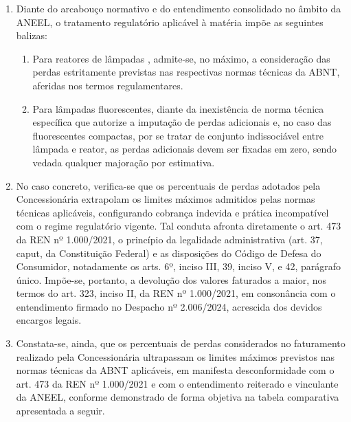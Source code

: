\begin{enumerate}[resume]
{(iii) determinar que esta decisão seja cumprida no prazo de 15 (quinze) dias após o seu trânsito em julgado; e  

(iv) determinar que a distribuidora envie à ANEEL, num prazo máximo de 15 (quinze) dias após o prazo previsto no item

(viii) desta decisão, comprovação do seu cumprimento. (grifou-se)}

\item
Diante do arcabouço normativo e do entendimento consolidado no âmbito da ANEEL, o tratamento regulatório aplicável à matéria impõe as seguintes balizas: 

\begin{enumerate}
    \ifperdaVapor
    \item %
    Para reatores de lâmpadas , admite-se, no máximo, a consideração das perdas estritamente previstas nas respectivas normas técnicas da ABNT, aferidas nos termos regulamentares.
    \fi
    \ifperdaFluorescente
    \item %
    Para lâmpadas fluorescentes, diante da inexistência de norma técnica específica que autorize a imputação de perdas adicionais  e, no caso das fluorescentes compactas, por se tratar de conjunto indissociável entre lâmpada e reator, as perdas adicionais devem ser fixadas em zero, sendo vedada qualquer majoração por estimativa.
    \fi
\end{enumerate}

\ifperdaVapor
\item %
No caso concreto, verifica-se que os percentuais de perdas adotados pela Concessionária extrapolam os limites máximos admitidos pelas normas técnicas aplicáveis, configurando cobrança indevida e prática incompatível com o regime regulatório vigente. Tal conduta afronta diretamente o art. 473 da REN nº 1.000/2021, o princípio da legalidade administrativa (art. 37, caput, da Constituição Federal) e as disposições do Código de Defesa do Consumidor, notadamente os arts. 6º, inciso III, 39, inciso V, e 42, parágrafo único. Impõe-se, portanto, a devolução dos valores faturados a maior, nos termos do art. 323, inciso II, da REN nº 1.000/2021, em consonância com o entendimento firmado no Despacho nº 2.006/2024, acrescida dos devidos encargos legais. 

\item %
Constata-se, ainda, que os percentuais de perdas considerados no faturamento realizado pela Concessionária ultrapassam os limites máximos previstos nas normas técnicas da ABNT aplicáveis, em manifesta desconformidade com o art. 473 da REN nº 1.000/2021 e com o entendimento reiterado e vinculante da ANEEL, conforme demonstrado de forma objetiva na tabela comparativa apresentada a seguir. 


\end{enumerate}
